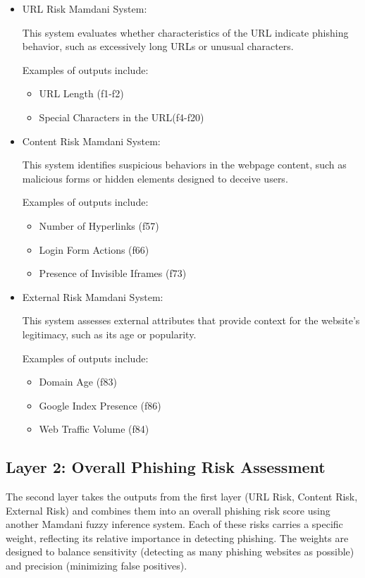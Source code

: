 \documentclass[11pt]{article}
\begin{document}
\begin{itemize}
    \item URL Risk Mamdani System: 
    
    This system evaluates whether characteristics of the URL indicate phishing behavior, such as excessively long URLs or unusual characters.

    Examples of outputs include:
    \begin{itemize}
        \item URL Length (f1-f2)
        \item Special Characters in the URL(f4-f20)
    \end{itemize}

    \item Content Risk Mamdani System:
    
    This system identifies suspicious behaviors in the webpage content, such as malicious forms or hidden elements designed to deceive users.

    Examples of outputs include:
    \begin{itemize}
        \item Number of Hyperlinks (f57)
        \item Login Form Actions (f66)
        \item Presence of Invisible Iframes (f73)
    \end{itemize}

    \item External Risk Mamdani System:
    
    This system assesses external attributes that provide context for the website's legitimacy, such as its age or popularity.

    Examples of outputs include:
    \begin{itemize}
        \item Domain Age (f83)
        \item Google Index Presence (f86)
        \item Web Traffic Volume (f84)
    \end{itemize}

\end{itemize}

\subsection{Layer 2: Overall Phishing Risk Assessment}

The second layer takes the outputs from the first layer (URL Risk, Content Risk, External Risk) and combines them into an overall phishing risk score using another Mamdani fuzzy inference system. Each of these risks carries a specific weight, reflecting its relative importance in detecting phishing. The weights are designed to balance sensitivity (detecting as many phishing websites as possible) and precision (minimizing false positives).
\end{document}
